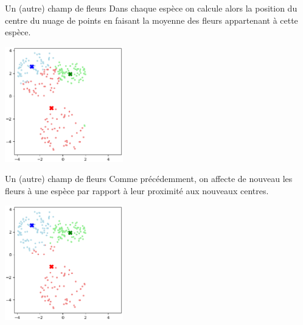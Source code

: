 \documentclass[10pt]{beamer}
\begin{document}
\begin{frame}{\Ctitle}{\stitle}
    \begin{exampleblock}{Un (autre) champ de fleurs}
        Dans chaque espèce on calcule alors la position du centre du nuage de points en faisant la moyenne des fleurs appartenant à cette espèce.
        \begin{center}
            \includegraphics[height=5cm]{ex2_kmeans2.eps}
        \end{center}
    \end{exampleblock}
\end{frame}

\begin{frame}{\Ctitle}{\stitle}
    \begin{exampleblock}{Un (autre) champ de fleurs}
        Comme précédemment, on affecte de nouveau les fleurs à une espèce par rapport à leur proximité aux nouveaux centres.
        \begin{center}
            \includegraphics[height=5cm]{ex2_kmeans3.eps}
        \end{center}
    \end{exampleblock}
\end{frame}
\end{document}
